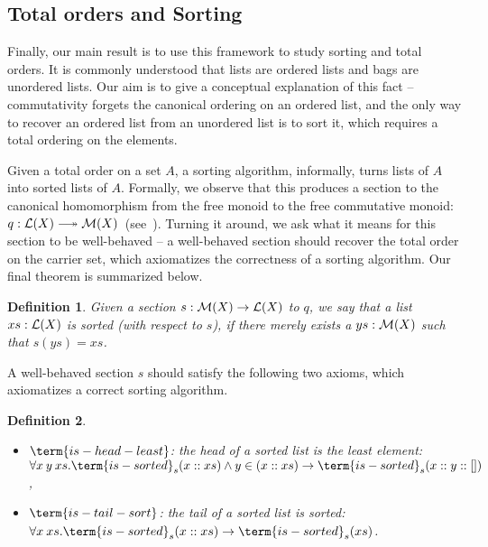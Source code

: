 \documentclass{article}
\newtheorem{definition}{Definition}
\begin{document}
\subsection*{Total orders and Sorting}

Finally, our main result is to use this framework to study sorting and total orders.
%
It is commonly understood that lists are ordered lists and bags are unordered lists.
%
Our aim is to give a conceptual explanation of this fact --
commutativity forgets the canonical ordering on an ordered list,
and the only way to recover an ordered list from an unordered list is to sort it,
which requires a total ordering on the elements.

Given a total order on a set $A$, a sorting algorithm, informally, turns lists of $A$ into sorted lists of $A$.
%
Formally, we observe that this produces a section to the canonical homomorphism
from the free monoid to the free commutative monoid:
$q : \LL(X) \longtwoheadrightarrow \MM(X)$~(see~\cite{joram_et_al:LIPIcs.ITP.2023.20}).
Turning it around, we ask what it means for this section to be well-behaved --
a well-behaved section should recover the total order on the carrier set,
which axiomatizes the correctness of a sorting algorithm.
Our final theorem is summarized below.

\begin{definition}
    Given a section $s : \mathcal{M}(X) \to \mathcal{L}(X)$ to $q$,
    we say that a list $xs : \mathcal{L}(X)$ is sorted (with respect to $s$),
    if there merely exists a $ys : \mathcal{M}(X)$ such that $s(ys) = xs$.
\end{definition}
\noindent
A well-behaved section $s$ should satisfy the following two axioms, which axiomatizes a correct sorting algorithm.
\begin{definition}
    \leavevmode
    \begin{itemize}[leftmargin=*]
        \item $\term{is-head-least}$: the head of a sorted list is the least element:
              \(
              \forall x \: y \: xs. \term{is-sorted}_{s}(x :: xs) \land y \in (x :: xs) \to \term{is-sorted}_{s}(x :: y :: [])
              \),
        \item $\term{is-tail-sort}$: the tail of a sorted list is sorted:
              \(
              \forall x \: xs. \term{is-sorted}_{s}(x :: xs) \to \term{is-sorted}_{s}(xs)
              \).
    \end{itemize}
\end{definition}
\end{document}
